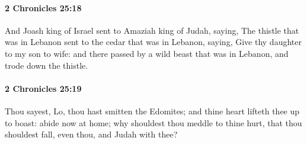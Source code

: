 		\paragraph{2 Chronicles 25:18} %
			\label{2CHRONICLES-25-18}

			And Joash king of Israel sent to Amaziah king of Judah, saying, The thistle that was in Lebanon sent to the cedar that was in Lebanon, saying, Give thy daughter to my son to wife: and there passed by a wild beast that was in Lebanon, and trode down the thistle.


		\paragraph{2 Chronicles 25:19} %
			\label{2CHRONICLES-25-19}

			Thou sayest, Lo, thou hast smitten the Edomites; and thine heart lifteth thee up to boast: abide now at home; why shouldest thou meddle to thine hurt, that thou shouldest fall, even thou, and Judah with thee?

